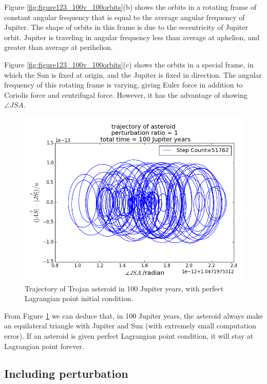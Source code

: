 \documentclass[12pt,a4paper]{article}
\begin{document}
Figure \ref{fig:figure123_100v_100orbits}(b) shows the orbits in a rotating frame of constant angular frequency that is equal to the average angular frequency of Jupiter. The shape of orbits in this frame is due to the eccentricity of Jupiter orbit. Jupiter is traveling in angular frequency less than average at aphelion, and greater than average at perihelion.

Figure \ref{fig:figure123_100v_100orbits}(c) shows the orbits in a special frame, in which the Sun is fixed at origin, and the Jupiter is fixed in direction. The angular frequency of this rotating frame is varying, giving Euler force in addition to Coriolis force and centrifugal force. However, it has the advantage of showing $\angle JSA$.


\begin{figure}[H]
\centering
\includegraphics[width = 5 in]{figure_5_100v_100orbits.png}
\caption{Trajectory of Trojan asteroid in 100 Jupiter years, with perfect Lagrangian point initial condition.}  
\label{fig: figure5_100v_100orbits}
\end{figure}


From Figure \ref{fig: figure5_100v_100orbits} we can deduce that, in 100 Jupiter years, the asteroid always make an equilateral triangle with Jupiter and Sun (with extremely small computation error). If an asteroid is given perfect Lagrangian point condition, it will stay at Lagrangian point forever.

\subsection{Including perturbation}
\end{document}
